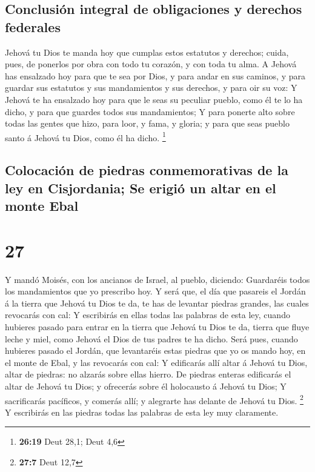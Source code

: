 \hypertarget{conclusiuxf3n-integral-de-obligaciones-y-derechos-federales}{%
\subsection{Conclusión integral de obligaciones y derechos
federales}\label{conclusiuxf3n-integral-de-obligaciones-y-derechos-federales}}

 Jehová tu Dios te manda hoy que cumplas estos estatutos y
derechos; cuida, pues, de ponerlos por obra con todo tu corazón, y con
toda tu alma.  A Jehová has ensalzado hoy para que te sea
por Dios, y para andar en sus caminos, y para guardar sus estatutos y
sus mandamientos y sus derechos, y para oir su voz:  Y
Jehová te ha ensalzado hoy para que le seas su peculiar pueblo, como él
te lo ha dicho, y para que guardes todos sus mandamientos; 
Y para ponerte alto sobre todas las gentes que hizo, para loor, y fama,
y gloria; y para que seas pueblo santo á Jehová tu Dios, como él ha
dicho. \footnote{\textbf{26:19} Deut 28,1; Deut 4,6}

\hypertarget{colocaciuxf3n-de-piedras-conmemorativas-de-la-ley-en-cisjordania-se-erigiuxf3-un-altar-en-el-monte-ebal}{%
\subsection{Colocación de piedras conmemorativas de la ley en
Cisjordania; Se erigió un altar en el monte
Ebal}\label{colocaciuxf3n-de-piedras-conmemorativas-de-la-ley-en-cisjordania-se-erigiuxf3-un-altar-en-el-monte-ebal}}

\hypertarget{section-26}{%
\section{27}\label{section-26}}

 Y mandó Moisés, con los ancianos de Israel, al pueblo,
diciendo: Guardaréis todos los mandamientos que yo prescribo hoy.
 Y será que, el día que pasareis el Jordán á la tierra que
Jehová tu Dios te da, te has de levantar piedras grandes, las cuales
revocarás con cal:  Y escribirás en ellas todas las palabras
de esta ley, cuando hubieres pasado para entrar en la tierra que Jehová
tu Dios te da, tierra que fluye leche y miel, como Jehová el Dios de tus
padres te ha dicho.  Será pues, cuando hubieres pasado el
Jordán, que levantaréis estas piedras que yo os mando hoy, en el monte
de Ebal, y las revocarás con cal:  Y edificarás allí altar á
Jehová tu Dios, altar de piedras: no alzarás sobre ellas hierro.
 De piedras enteras edificarás el altar de Jehová tu Dios; y
ofrecerás sobre él holocausto á Jehová tu Dios;  Y
sacrificarás pacíficos, y comerás allí; y alegrarte has delante de
Jehová tu Dios. \footnote{\textbf{27:7} Deut 12,7}  Y
escribirás en las piedras todas las palabras de esta ley muy claramente.

